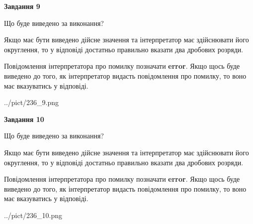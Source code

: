 \documentclass[12pt, ukrainian]{article}
\begin{document}
{\begin {Large}
{\begin {center}\textbf{Завдання 9}\end {center}}\par
Що буде виведено за виконання? \par

Якщо має бути виведено дійсне значення та інтерпретатор має здійснювати його округлення, 
то у відповіді достатньо правильно вказати два дробових розряди.

Повідомлення інтерпретатора про помилку позначати \textbf{error}.
Якщо щось буде виведено до того, як інтерпретатор видасть повідомлення про помилку, 
то воно має вказуватись у відповіді. \par

\begin{center}
	{../pict/236_9.png}
\end{center}
\newpage

{\begin {center}\textbf{Завдання 10}\end {center}}\par
Що буде виведено за виконання? \par

Якщо має бути виведено дійсне значення та інтерпретатор має здійснювати його округлення, 
то у відповіді достатньо правильно вказати два дробових розряди.

Повідомлення інтерпретатора про помилку позначати \textbf{error}.
Якщо щось буде виведено до того, як інтерпретатор видасть повідомлення про помилку, 
то воно має вказуватись у відповіді. \par

\begin{center}
	{../pict/236_10.png}
\end{center}
\newpage

\end {Large}}
\end{document}
